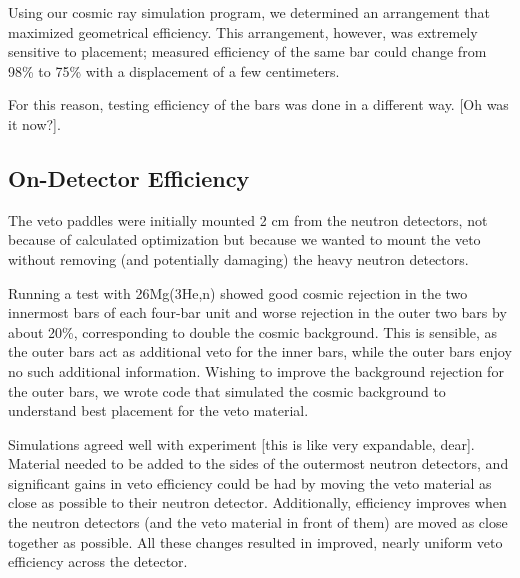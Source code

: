 Using our cosmic ray simulation program, we determined an arrangement that maximized geometrical efficiency.  This arrangement, however, was extremely sensitive to placement; measured efficiency of the same bar could change from 98\% to 75\% with a displacement of a few centimeters.

For this reason, testing efficiency of the bars was done in a different way.  [Oh was it now?].

\subsection{On-Detector Efficiency}

The veto paddles were initially mounted 2 cm from the neutron detectors, not because of calculated optimization but because we wanted to mount the veto without removing (and potentially damaging) the heavy neutron detectors.

Running a test with 26Mg(3He,n) showed good cosmic rejection in the two innermost bars of each four-bar unit and worse rejection in the outer two bars by about 20\%, corresponding to double the cosmic background.  This is sensible, as the outer bars act as additional veto for the inner bars, while the outer bars enjoy no such additional information.  Wishing to improve the background rejection for the outer bars, we wrote code that simulated the cosmic background to understand best placement for the veto material.

Simulations agreed well with experiment [this is like very expandable, dear].  Material needed to be added to the sides of the outermost neutron detectors, and significant gains in veto efficiency could be had by moving the veto material as close as possible to their neutron detector.  Additionally, efficiency improves when the neutron detectors (and the veto material in front of them) are moved as close together as possible.  All these changes resulted in improved, nearly uniform veto efficiency across the detector.

